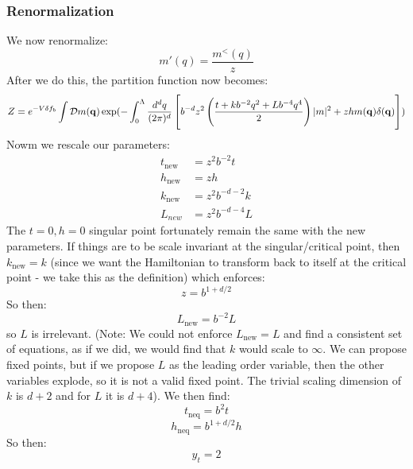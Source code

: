 \subsubsection*{Renormalization}
We now renormalize:
\begin{equation}
    m'(q) = \frac{m^<(q)}{z}
\end{equation}
After we do this, the partition function now becomes:
\begin{equation}
    Z = e^{-V\delta f_b}\int \mathcal{D}m(\mathbf{q})\exp(-\int_0^\Lambda \frac{d^dq}{(2\pi)^d}\left[b^{-d}z^2\left(\frac{t + kb^{-2}q^2 + Lb^{-4}q^4}{2}\right)\lvert m \rvert^2 + zhm(\mathbf{q})\delta(\mathbf{q})\right])
\end{equation}
Nowm we rescale our parameters:
\begin{subequations}
    \begin{align}
        t_{\text{new}} &= z^2b^{-2}t 
        \\ h_{\text{new}} &= z h
        \\ k_{\text{new}} &= z^2b^{-d-2}k 
        \\ L_{new} &= z^2 b^{-d-4}L
    \end{align}
\end{subequations}
The $t = 0, h = 0$ singular point fortunately remain the same with the new parameters. If things are to be scale invariant at the singular/critical point, then $k_{\text{new}} = k$ (since we want the Hamiltonian to transform back to itself at the critical point - we take this as the definition) which enforces:
\begin{equation}
    z = b^{1 + d/2}
\end{equation}
So then:
\begin{equation}
    L_{\text{new}} = b^{-2}L
\end{equation}
so $L$ is irrelevant. (Note: We could not enforce $L_{\text{new}} = L$ and find a consistent set of equations, as if we did, we would find that $k$ would scale to $\infty$. We can propose fixed points, but if we propose $L$ as the leading order variable, then the other variables explode, so it is not a valid fixed point. The trivial scaling dimension of $k$ is $d + 2$ and for $L$ it is $d + 4$). We then find:
\begin{equation}
    t_{\text{neq}} = b^2t
\end{equation}
\begin{equation}
    h_{\text{neq}} = b^{1+d/2}h
\end{equation}
So then:
\begin{equation}
    y_t = 2
\end{equation}
